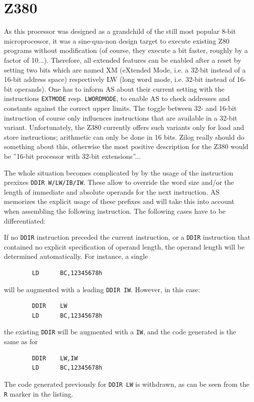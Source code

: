 \documentclass[12pt,twoside]{report}
\newcommand{\tty}[1]{{\tt #1}}
\newcommand{\asname}{{AS}}
\begin{document}

\section{Z380}

As this processor was designed as a grandchild of the still most popular
8-bit microprocessor, it was a sine-qua-non design target to execute
existing Z80 programs without modification (of course, they execute a bit
faster, roughly by a factor of 10...).  Therefore, all extended features
can be enabled after a reset by setting two bits which are named XM
(eXtended Mode, i.e. a 32-bit instead of a 16-bit address space)
respectively LW (long word mode, i.e. 32-bit instead of 16-bit operands).
One has to inform \asname{} about their current setting with the instructions
\tty{EXTMODE} resp. \tty{LWORDMODE}, to enable \asname{} to check addresses and
constants against the correct upper limits.  The toggle between 32- and
16-bit instruction of course only influences instructions that are
available in a 32-bit variant.  Unfortunately, the Z380 currently offers
such variants only for load and store instructions; arithmetic can only be
done in 16 bits.  Zilog really should do something about this, otherwise
the most positive description for the Z380 would be ''16-bit processor
with 32-bit extensions''...

The whole situation becomes complicated by by the usage of the instruction
prexixes \tty{DDIR W/LW/IB/IW}.  These allow to override the word size
and/or the length of immediate and absolute operands for the next instruction.
\asname{} memorizes the explicit usage of these prefixes and will take this
into account when assembling the following instruction.  The following
cases have to be differentiated:

If no \tty{DDIR} instruction preceded the current instruction, or a \tty{DDIR}
instruction that contained no explicit specification of operand length, the
operand length will be determined automatically.  For instance, a single
\begin{verbatim}
        LD      BC,12345678h
\end{verbatim}
will be augmented with a leading \tty{DDIR IW}.  However, in this case:
\begin{verbatim}
        DDIR    LW
        LD      BC,12345678h
\end{verbatim}
the existing \tty{DDIR} will be augmented with a \tty{IW}, and the code
generated is the same as for
\begin{verbatim}
        DDIR    LW,IW
        LD      BC,12345678h
\end{verbatim}
The code generated previously for \tty{DDIR LW} is withdrawn, as can be seen
from the \tty{R} marker in the listing.
\end{document}
